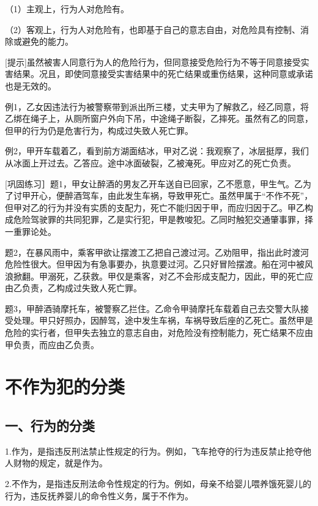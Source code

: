 （1）主观上，行为人对危险有。

（2）客观上，行为人对危险有，也即基于自己的意志自由，对危险具有控制、消除或避免的能力。

[提示]虽然被害人同意行为人的危险行为，但同意接受危险行为不等于同意接受实害结果。况且，即使同意接受实害结果中的死亡结果或重伤结果，这种同意或承诺也是无效的。

例1，乙女因违法行为被警察带到派出所三楼，丈夫甲为了解救乙，经乙同意，将乙绑在绳子上，从厕所窗户外向下吊，中途绳子断裂，乙摔死。虽然有乙的同意，但甲的行为仍是危害行为，构成过失致人死亡罪。

例2，甲开车载着乙，看到前方湖面结冰，甲对乙说：我观察了，冰层挺厚，我们从冰面上开过去。乙答应。途中冰面破裂，乙被淹死。甲应对乙的死亡负责。

[巩固练习］题1，甲女让醉酒的男友乙开车送自已回家，乙不愿意，甲生气。乙为了讨甲开心，便醉酒驾车，由此发生车祸，导致甲死亡。虽然甲属于“不作不死”，但甲对乙的行为并没有实质的支配力，死亡不能归因于甲，而应归因于乙。甲乙构成危险驾驶罪的共同犯罪，乙是实行犯，甲是教唆犯。乙同时触犯交通肇事罪，择一重罪论处。

题2，在暴风雨中，乘客甲欲让摆渡工乙把自己渡过河。乙劝阻甲，指出此时渡河危险性很大。但甲因为有急事要办，执意要过河。乙只好冒险摆渡。船在河中被风浪掀翻。甲溺死，乙获救。甲仅是乘客，对乙不会形成支配力，因此，甲的死亡应由乙负责，乙构成过失致人死亡罪。

题3，甲醉酒骑摩托车，被警察乙拦住。乙命令甲骑摩托车载着自己去交警大队接受处理。甲只好照办，因醉驾，途中发生车祸，车祸导致后座的乙死亡。虽然甲是危险的实行者，但甲失去独立的意志自由，对危险没有控制能力，死亡结果不应由甲负责，而应由乙负责。


\section{不作为犯的分类}


\subsection*{一、行为的分类}

1.作为，是指违反刑法禁止性规定的行为。例如，飞车抢夺的行为违反禁止抢夺他人财物的规定，就是作为。

2.不作为，是指违反刑法命令性规定的行为。例如，母亲不给婴儿喂养饿死婴儿的行为，违反抚养婴儿的命令性义务，属于不作为。

